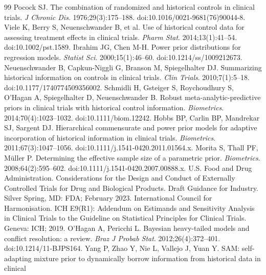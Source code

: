 \documentclass[11pt]{article}
\begin{document}
\begin{thebibliography}{99}
\small
 Pocock SJ. The combination of randomized and historical controls
in clinical trials. \emph{J Chronic Dis}. 1976;29(3):175--188.
doi:10.1016/0021-9681(76)90044-8.
 Viele K, Berry S, Neuenschwander B, et al. Use of historical
control data for assessing treatment effects in clinical trials. \emph{Pharm
Stat}. 2014;13(1):41--54. doi:10.1002/pst.1589.
 Ibrahim JG, Chen M-H. Power prior distributions for regression
models. \emph{Statist Sci}. 2000;15(1):46--60. doi:10.1214/ss/1009212673.
 Neuenschwander B, Capkun-Niggli G, Branson M, Spiegelhalter DJ.
Summarizing historical information on controls in clinical trials. \emph{Clin
Trials}. 2010;7(1):5--18. doi:10.1177/1740774509356002.
 Schmidli H, Gsteiger S, Roychoudhury S, O'Hagan A, Spiegelhalter
D, Neuenschwander B. Robust meta-analytic-predictive priors in clinical trials
with historical control information. \emph{Biometrics}. 2014;70(4):1023--1032.
doi:10.1111/biom.12242.
 Hobbs BP, Carlin BP, Mandrekar SJ, Sargent DJ. Hierarchical
commensurate and power prior models for adaptive incorporation of historical
information in clinical trials. \emph{Biometrics}. 2011;67(3):1047--1056.
doi:10.1111/j.1541-0420.2011.01564.x.
 Morita S, Thall PF, M\"uller P. Determining the effective sample
size of a parametric prior. \emph{Biometrics}. 2008;64(2):595--602.
doi:10.1111/j.1541-0420.2007.00888.x.
 U.S. Food and Drug Administration. Considerations for the Design
and Conduct of Externally Controlled Trials for Drug and Biological Products.
Draft Guidance for Industry. Silver Spring, MD: FDA; February 2023.
 International Council for Harmonisation. ICH E9(R1): Addendum on
Estimands and Sensitivity Analysis in Clinical Trials to the Guideline on
Statistical Principles for Clinical Trials. Geneva: ICH; 2019.
 O'Hagan A, Pericchi L. Bayesian heavy-tailed models and conflict
resolution: a review. \emph{Braz J Probab Stat}. 2012;26(4):372--401.
doi:10.1214/11-BJPS164.
 Yang P, Zhao Y, Nie L, Vallejo J, Yuan Y. SAM: self-adapting
mixture prior to dynamically borrow information from historical data in clinical

\end{thebibliography}
\end{document}
